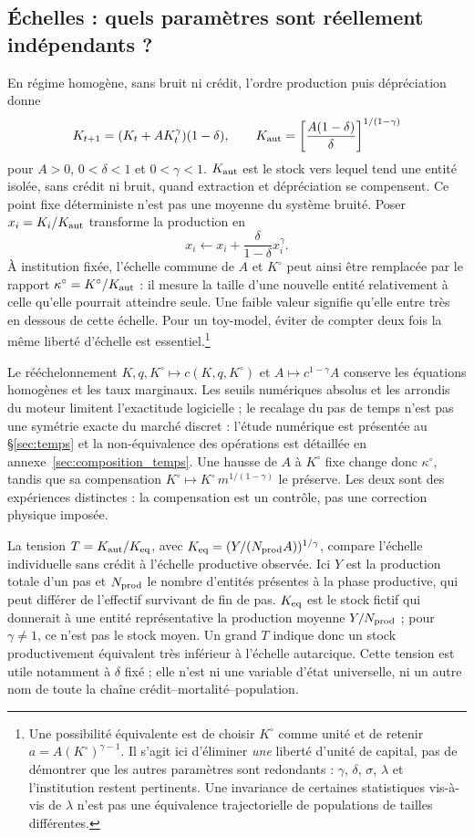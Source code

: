 \subsection{Échelles : quels paramètres sont réellement indépendants ?}
\label{sec:parametres_reduits}
En régime homogène, sans bruit ni crédit, l'ordre production puis
dépréciation donne
\[
 K_{t+1}=(K_t+A K_t^\gamma)(1-\delta),\qquad
 K_{\rm aut}=\left[\frac{A(1-\delta)}{\delta}\right]^{1/(1-\gamma)}
\]
pour $A>0$, $0<\delta<1$ et $0<\gamma<1$. $K_{\rm aut}$ est le stock vers lequel tend une entité isolée, sans
crédit ni bruit, quand extraction et dépréciation se compensent. Ce point
fixe déterministe n'est pas une moyenne du système bruité. Poser $x_i=K_i/K_{\rm aut}$ transforme
la production en
\[
 x_i\longleftarrow x_i+\frac{\delta}{1-\delta}x_i^\gamma .
\]
À institution fixée, l'échelle commune de $A$ et $K^\circ$ peut ainsi être remplacée
par le rapport $\kappa^\circ=K^\circ/K_{\rm aut}$ : il mesure la taille
d'une nouvelle entité relativement à celle qu'elle pourrait atteindre seule.
Une faible valeur signifie qu'elle entre très en dessous de cette échelle. Pour un toy-model, éviter de compter
deux fois la même liberté d'échelle est essentiel.\footnote{Une possibilité
équivalente est de choisir $K^\circ$ comme unité et de retenir
$a=A (K^\circ)^{\gamma-1}$. Il s'agit ici d'éliminer \emph{une} liberté d'unité de
capital, pas de démontrer que les autres paramètres sont redondants :
$\gamma$, $\delta$, $\sigma$, $\lambda$ et l'institution restent pertinents.
Une invariance de certaines statistiques vis-à-vis de $\lambda$ n'est pas une
équivalence trajectorielle de populations de tailles différentes.}

Le rééchelonnement $K,q,K^\circ\mapsto c(K,q,K^\circ)$ et
$A\mapsto c^{1-\gamma}A$ conserve les équations homogènes et les taux
marginaux. Les seuils numériques absolus et les arrondis du moteur limitent
l'exactitude logicielle ; le recalage du pas de temps n'est pas une symétrie
exacte du marché discret : l'étude numérique est présentée au
§\ref{sec:temps} et la non-équivalence des opérations est détaillée en
annexe~\ref{sec:composition_temps}. Une hausse de $A$ à $K^\circ$ fixe change donc
$\kappa^\circ$, tandis que sa compensation $K^\circ\mapsto
K^\circ\,m^{1/(1-\gamma)}$ le préserve. Les deux sont des expériences distinctes :
la compensation est un contrôle, pas une correction physique imposée.

La tension $T=K_{\rm aut}/K_{\rm eq}$, avec
$K_{\rm eq}=(Y/(N_{\rm prod}A))^{1/\gamma}$, compare l'échelle individuelle
sans crédit à l'échelle productive observée. Ici $Y$ est la production totale
d'un pas et $N_{\rm prod}$ le nombre d'entités présentes à la phase productive,
qui peut différer de l'effectif survivant de fin de pas. $K_{\rm eq}$ est
le stock fictif qui donnerait à une entité représentative la production
moyenne $Y/N_{\rm prod}$ ; pour $\gamma\ne1$, ce n'est pas le stock moyen.
Un grand $T$ indique donc un stock productivement équivalent très inférieur
à l'échelle autarcique. Cette tension est utile notamment à
$\delta$ fixé ; elle n'est ni une variable d'état universelle, ni un autre nom
de toute la chaîne crédit--mortalité--population.

